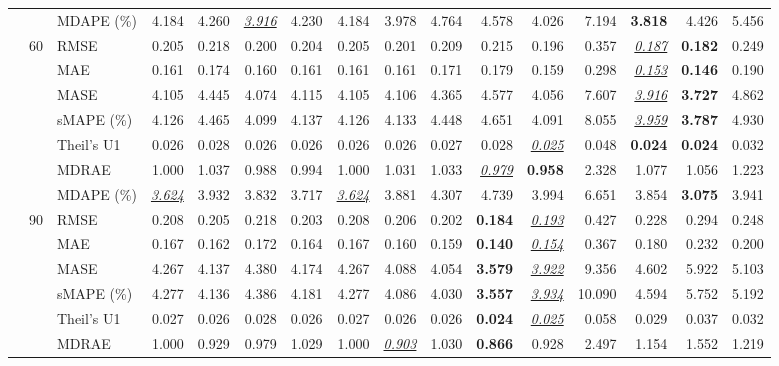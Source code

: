 \begin{table}[!htbp]
{\begin{tabular}{lllrrrrrrrrrrrrr}
 &  & MDAPE (\%) & 4.184 & 4.260 & \underline{\textit{3.916}} & 4.230 & 4.184 & 3.978 & 4.764 & 4.578 & 4.026 & 7.194 & \textbf{3.818} & 4.426 & 5.456 \\
\cmidrule(lr){2-16}
 & 60 & RMSE & 0.205 & 0.218 & 0.200 & 0.204 & 0.205 & 0.201 & 0.209 & 0.215 & 0.196 & 0.357 & \underline{\textit{0.187}} & \textbf{0.182} & 0.249 \\
 &  & MAE & 0.161 & 0.174 & 0.160 & 0.161 & 0.161 & 0.161 & 0.171 & 0.179 & 0.159 & 0.298 & \underline{\textit{0.153}} & \textbf{0.146} & 0.190 \\
 &  & MASE & 4.105 & 4.445 & 4.074 & 4.115 & 4.105 & 4.106 & 4.365 & 4.577 & 4.056 & 7.607 & \underline{\textit{3.916}} & \textbf{3.727} & 4.862 \\
 &  & sMAPE (\%) & 4.126 & 4.465 & 4.099 & 4.137 & 4.126 & 4.133 & 4.448 & 4.651 & 4.091 & 8.055 & \underline{\textit{3.959}} & \textbf{3.787} & 4.930 \\
 &  & Theil's U1 & 0.026 & 0.028 & 0.026 & 0.026 & 0.026 & 0.026 & 0.027 & 0.028 & \underline{\textit{0.025}} & 0.048 & \textbf{0.024} & \textbf{0.024} & 0.032 \\
 &  & MDRAE & 1.000 & 1.037 & 0.988 & 0.994 & 1.000 & 1.031 & 1.033 & \underline{\textit{0.979}} & \textbf{0.958} & 2.328 & 1.077 & 1.056 & 1.223 \\
 &  & MDAPE (\%) & \underline{\textit{3.624}} & 3.932 & 3.832 & 3.717 & \underline{\textit{3.624}} & 3.881 & 4.307 & 4.739 & 3.994 & 6.651 & 3.854 & \textbf{3.075} & 3.941 \\
\cmidrule(lr){2-16}
 & 90 & RMSE & 0.208 & 0.205 & 0.218 & 0.203 & 0.208 & 0.206 & 0.202 & \textbf{0.184} & \underline{\textit{0.193}} & 0.427 & 0.228 & 0.294 & 0.248 \\
 &  & MAE & 0.167 & 0.162 & 0.172 & 0.164 & 0.167 & 0.160 & 0.159 & \textbf{0.140} & \underline{\textit{0.154}} & 0.367 & 0.180 & 0.232 & 0.200 \\
 &  & MASE & 4.267 & 4.137 & 4.380 & 4.174 & 4.267 & 4.088 & 4.054 & \textbf{3.579} & \underline{\textit{3.922}} & 9.356 & 4.602 & 5.922 & 5.103 \\
 &  & sMAPE (\%) & 4.277 & 4.136 & 4.386 & 4.181 & 4.277 & 4.086 & 4.030 & \textbf{3.557} & \underline{\textit{3.934}} & 10.090 & 4.594 & 5.752 & 5.192 \\
 &  & Theil's U1 & 0.027 & 0.026 & 0.028 & 0.026 & 0.027 & 0.026 & 0.026 & \textbf{0.024} & \underline{\textit{0.025}} & 0.058 & 0.029 & 0.037 & 0.032 \\
 &  & MDRAE & 1.000 & 0.929 & 0.979 & 1.029 & 1.000 & \underline{\textit{0.903}} & 1.030 & \textbf{0.866} & 0.928 & 2.497 & 1.154 & 1.552 & 1.219 \\

\end{tabular}}
\end{table}
